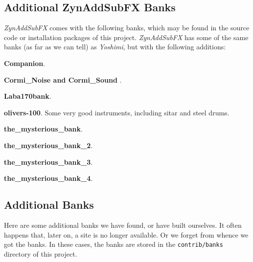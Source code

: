 \subsection{Additional ZynAddSubFX Banks}
\label{subsec:banks_collection_zynaddsubfx}

   \textsl{ZynAddSubFX} comes with the following banks, which may be found in
   the source code \cite{zynsource} or installation packages of this project.
   \textsl{ZynAddSubFX} has some of the same
   banks (as far as we can tell) as \textsl{Yoshimi}, but with the following
   additions:

   \begin{enumber}
      \item \textbf{Companion}.
      \item \textbf{Cormi\_Noise and Cormi\_Sound} \cite{cormi}.
      \item \textbf{Laba170bank}.
      \item \textbf{olivers-100}.
         Some very good instruments, including sitar
         and steel drums.
      \item \textbf{the\_mysterious\_bank}.
      \item \textbf{the\_mysterious\_bank\_2}.
      \item \textbf{the\_mysterious\_bank\_3}.
      \item \textbf{the\_mysterious\_bank\_4}.
   \end{enumber}

\subsection{Additional Banks}
\label{subsec:banks_collection_additional}

   Here are some additional banks we have found, or have built ourselves.
   It often happens that, later on, a site is no longer available.
   Or we forget from whence we got the banks.
   In these cases, the banks are stored in the \texttt{contrib/banks}
   directory of this project.

